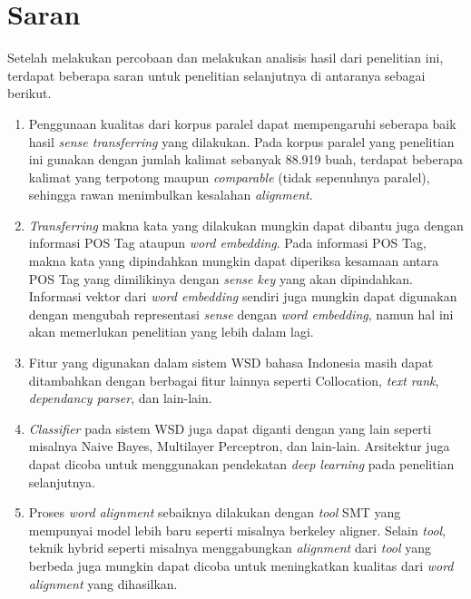 \section{Saran}
Setelah melakukan percobaan dan melakukan analisis hasil dari penelitian ini, terdapat beberapa saran untuk penelitian selanjutnya di antaranya sebagai berikut.

\begin{enumerate}
	\item Penggunaan kualitas dari korpus paralel dapat mempengaruhi seberapa baik hasil \textit{sense transferring} yang dilakukan. Pada korpus paralel yang penelitian ini gunakan dengan jumlah kalimat sebanyak 88.919 buah, terdapat beberapa kalimat yang terpotong maupun \textit{comparable} (tidak sepenuhnya paralel), sehingga rawan menimbulkan kesalahan \textit{alignment}.
	\item \textit{Transferring} makna kata yang dilakukan mungkin dapat dibantu juga dengan informasi POS Tag ataupun \textit{word embedding}. Pada informasi POS Tag, makna kata yang dipindahkan mungkin dapat diperiksa kesamaan antara POS Tag yang dimilikinya dengan \textit{sense key} yang akan dipindahkan. Informasi vektor dari \textit{word embedding} sendiri juga mungkin dapat digunakan dengan mengubah representasi \textit{sense} dengan \textit{word embedding}, namun hal ini akan memerlukan penelitian yang lebih dalam lagi.
	\item Fitur yang digunakan dalam sistem WSD bahasa Indonesia masih dapat ditambahkan dengan berbagai fitur lainnya seperti Collocation, \textit{text rank}, \textit{dependancy parser}, dan lain-lain.
	\item \textit{Classifier} pada sistem WSD juga dapat diganti dengan yang lain seperti misalnya Naive Bayes, Multilayer Perceptron, dan lain-lain. Arsitektur juga dapat dicoba untuk menggunakan pendekatan \textit{deep learning} pada penelitian selanjutnya.
	\item Proses \textit{word alignment} sebaiknya dilakukan dengan \textit{tool} SMT yang mempunyai model lebih baru seperti misalnya berkeley aligner. Selain \textit{tool}, teknik hybrid seperti misalnya menggabungkan \textit{alignment} dari \textit{tool} yang berbeda juga mungkin dapat dicoba untuk meningkatkan kualitas dari \textit{word alignment} yang dihasilkan.
\end{enumerate}